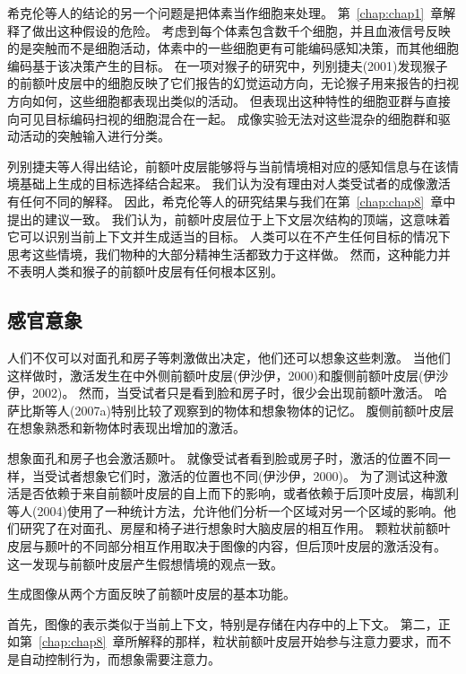 希克伦等人的结论的另一个问题是把体素当作细胞来处理。
第~\ref{chap:chap1}~章解释了做出这种假设的危险。
考虑到每个体素包含数千个细胞，并且血液信号反映的是突触而不是细胞活动，体素中的一些细胞更有可能编码感知决策，而其他细胞编码基于该决策产生的目标。
在一项对猴子的研究中，列别捷夫(2001)发现猴子的前额叶皮层中的细胞反映了它们报告的幻觉运动方向，无论猴子用来报告的扫视方向如何，这些细胞都表现出类似的活动。
但表现出这种特性的细胞亚群与直接向可见目标编码扫视的细胞混合在一起。
成像实验无法对这些混杂的细胞群和驱动活动的突触输入进行分类。
\par


列别捷夫等人得出结论，前额叶皮层能够将与当前情境相对应的感知信息与在该情境基础上生成的目标选择结合起来。
我们认为没有理由对人类受试者的成像激活有任何不同的解释。
因此，希克伦等人的研究结果与我们在第~\ref{chap:chap8}~章中提出的建议一致。
我们认为，前额叶皮层位于上下文层次结构的顶端，这意味着它可以识别当前上下文并生成适当的目标。
人类可以在不产生任何目标的情况下思考这些情境，我们物种的大部分精神生活都致力于这样做。
然而，这种能力并不表明人类和猴子的前额叶皮层有任何根本区别。



\subsection{感官意象}
\par

人们不仅可以对面孔和房子等刺激做出决定，他们还可以想象这些刺激。
当他们这样做时，激活发生在中外侧前额叶皮层(伊沙伊，2000)和腹侧前额叶皮层(伊沙伊，2002)。
然而，当受试者只是看到脸和房子时，很少会出现前额叶激活。
哈萨比斯等人(2007a)特别比较了观察到的物体和想象物体的记忆。
腹侧前额叶皮层在想象熟悉和新物体时表现出增加的激活。
\par


想象面孔和房子也会激活颞叶。
就像受试者看到脸或房子时，激活的位置不同一样，当受试者想象它们时，激活的位置也不同(伊沙伊，2000)。
为了测试这种激活是否依赖于来自前额叶皮层的自上而下的影响，或者依赖于后顶叶皮层，梅凯利等人(2004)使用了一种统计方法，允许他们分析一个区域对另一个区域的影响。他们研究了在对面孔、房屋和椅子进行想象时大脑皮层的相互作用。
颗粒状前额叶皮层与颞叶的不同部分相互作用取决于图像的内容，但后顶叶皮层的激活没有。
这一发现与前额叶皮层产生假想情境的观点一致。
\par


生成图像从两个方面反映了前额叶皮层的基本功能。
\par


首先，图像的表示类似于当前上下文，特别是存储在内存中的上下文。
第二，正如第~\ref{chap:chap8}~章所解释的那样，粒状前额叶皮层开始参与注意力要求，而不是自动控制行为，而想象需要注意力。
\par


